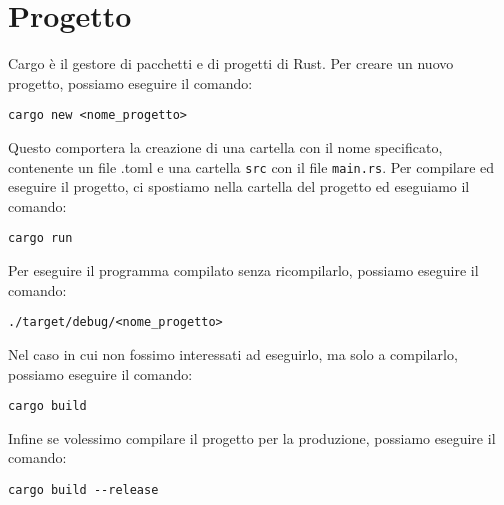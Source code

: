 \documentclass[12pt]{article}
\begin{document}
\section{Progetto}
Cargo è il gestore di pacchetti e di progetti di Rust. 
Per creare un nuovo progetto, possiamo eseguire il comando:
\begin{verbatim}
cargo new <nome_progetto>
\end{verbatim}
Questo comportera la creazione di una cartella con il nome specificato,
contenente un file .toml e una cartella \texttt{src} con il file \texttt{main.rs}.
Per compilare ed eseguire il progetto, ci spostiamo nella cartella del progetto
ed eseguiamo il comando:
\begin{verbatim}
cargo run
\end{verbatim}
Per eseguire il programma compilato senza ricompilarlo, possiamo eseguire il comando:
\begin{verbatim}
./target/debug/<nome_progetto>
\end{verbatim}
Nel caso in cui non fossimo interessati ad eseguirlo, ma solo a compilarlo,
possiamo eseguire il comando:
\begin{verbatim}
cargo build
\end{verbatim}
Infine se volessimo compilare il progetto per la produzione, possiamo eseguire il comando:
\begin{verbatim}
cargo build --release
\end{verbatim}
\end{document}
